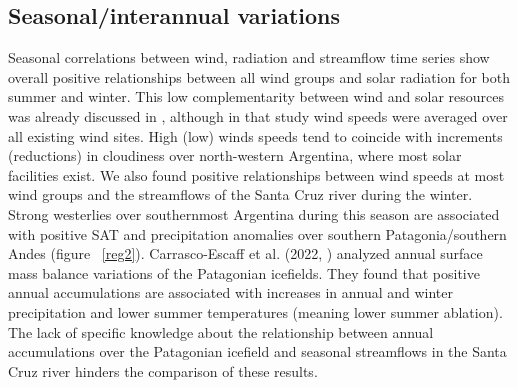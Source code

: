\documentclass[AMA,Times1COL]{WileyNJDv5} %
\begin{document}
\begin{linenumbers}
\subsection{Seasonal/interannual variations}

Seasonal correlations between wind, radiation and streamflow time series show overall positive relationships between all wind groups and solar radiation for both summer and winter. This low complementarity between wind and solar resources was already discussed in \cite{bianchi2022assessing}, although in that study wind speeds were averaged over all existing wind sites. High (low) winds speeds tend to coincide with increments (reductions) in cloudiness over north-western Argentina, where most solar facilities exist. We also found positive relationships between wind speeds at most wind groups and the streamflows of the Santa Cruz river during the winter. Strong westerlies over southernmost Argentina during this season are associated with positive SAT and precipitation anomalies over southern Patagonia/southern Andes (figure ~\ref{reg2}). Carrasco-Escaff et al. (2022, \cite{carrasco2022climatic}) analyzed annual surface mass balance variations of the Patagonian icefields. They found that positive annual accumulations are associated with increases in annual and winter precipitation and lower summer temperatures (meaning lower summer ablation). The lack of specific knowledge about the relationship between annual accumulations over the Patagonian icefield and seasonal streamflows in the Santa Cruz river hinders the comparison of these results. 


\end{linenumbers}
\end{document}
